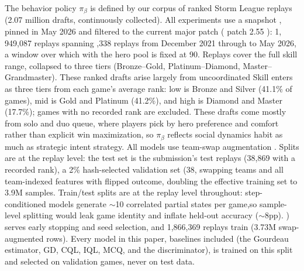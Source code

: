 \documentclass[journal]{IEEEtran}
\providecommand{\DIFaddtex}[1]{{\protect\color{blue} \sf #1}} %
\providecommand{\DIFdeltex}[1]{{\protect\color{red} \scriptsize #1}} %
\providecommand{\DIFaddbegin}{} %
\providecommand{\DIFaddend}{} %
\providecommand{\DIFdelbegin}{} %
\providecommand{\DIFdelend}{} %
\providecommand{\DIFadd}[1]{\texorpdfstring{\DIFaddtex{#1}}{#1}} %
\providecommand{\DIFdel}[1]{\texorpdfstring{\DIFdeltex{#1}}{}} %
\begin{document}
\DIFdelend The behavior policy $\pi_\beta$ is \DIFdelbegin \DIFdel{defined by }\DIFdelend our corpus of ranked Storm League replays\DIFdelbegin \DIFdel{(2.07 million drafts, continuously collected). All experiments use a snapshot }\DIFdelend \DIFaddbegin \DIFadd{, }\DIFaddend pinned in May 2026 and filtered to \DIFdelbegin \DIFdel{the current major patch (}\DIFdelend \DIFaddbegin \DIFadd{patch }\DIFaddend 2.55\DIFdelbegin \DIFdel{)}\DIFdelend : 1,\DIFdelbegin \DIFdel{949,087 replays spanning }\DIFdelend \DIFaddbegin \DIFadd{943,338 replays from }\DIFaddend December 2021 \DIFdelbegin \DIFdel{through }\DIFdelend \DIFaddbegin \DIFadd{to }\DIFaddend May 2026, \DIFdelbegin \DIFdel{a window over which }\DIFdelend \DIFaddbegin \DIFadd{with }\DIFaddend the hero pool \DIFdelbegin \DIFdel{is }\DIFdelend fixed at 90. \DIFdelbegin \DIFdel{Replays cover the full skill range, collapsed to three tiers (Bronze--Gold, Platinum--Diamond, Master--Grandmaster). These ranked drafts arise largely from uncoordinated }\DIFdelend \DIFaddbegin \DIFadd{Skill enters as three tiers from each game's average rank: low is Bronze and Silver (41.1\% of games), mid is Gold and Platinum (41.2\%), and high is Diamond and Master (17.7\%); games with no recorded rank are excluded. These drafts come mostly from }\DIFaddend solo and duo queue, where players pick by \DIFdelbegin \DIFdel{hero }\DIFdelend preference and comfort\DIFdelbegin \DIFdel{rather than explicit win maximization}\DIFdelend , so $\pi_\beta$ reflects social \DIFdelbegin \DIFdel{dynamics }\DIFdelend \DIFaddbegin \DIFadd{habit }\DIFaddend as much as \DIFdelbegin \DIFdel{strategic intent}\DIFdelend \DIFaddbegin \DIFadd{strategy}\DIFaddend . All models use team-swap augmentation\DIFaddbegin \DIFadd{. Splits are at the replay level: the test set is the submission's test replays (38,869 with a recorded rank), a 2\% hash-selected validation set (38}\DIFaddend ,\DIFdelbegin \DIFdel{swapping teams and all team-indexed features with flipped outcome, doubling the effective training set to 3.9M samples. Train/test splits are at the replay level throughout: step-conditioned models generate $\sim$10 correlated partial states per game,so sample-level splitting would leak game identity and inflate held-out accuracy ($\sim$8pp).
}\DIFdelend \DIFaddbegin \DIFadd{100) serves early stopping and seed selection, and 1,866,369 replays train (3.73M swap-augmented rows). Every model in this paper, baselines included (the Gourdeau estimator, GD, CQL, IQL, MCQ, and the discriminator), is trained on this split and selected on validation games, never on test data.
}\DIFaddend 
\end{document}
